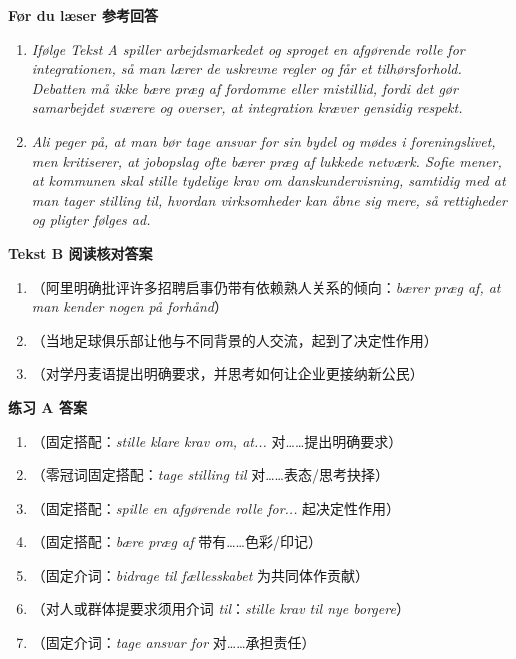 \begin{answerbox}
\textbf{Før du læser 参考回答}
\begin{enumerate}
  \item \textit{Ifølge Tekst A spiller arbejdsmarkedet og sproget en afgørende rolle for integrationen, så man lærer de uskrevne regler og får et tilhørsforhold. Debatten må ikke bære præg af fordomme eller mistillid, fordi det gør samarbejdet sværere og overser, at integration kræver gensidig respekt.}
  \item \textit{Ali peger på, at man bør tage ansvar for sin bydel og mødes i foreningslivet, men kritiserer, at jobopslag ofte bærer præg af lukkede netværk. Sofie mener, at kommunen skal stille tydelige krav om danskundervisning, samtidig med at man tager stilling til, hvordan virksomheder kan åbne sig mere, så rettigheder og pligter følges ad.}
\end{enumerate}

\textbf{Tekst B 阅读核对答案}
\begin{enumerate}
  \item {}（阿里明确批评许多招聘启事仍带有依赖熟人关系的倾向：\textit{bærer præg af, at man kender nogen på forhånd}）
  \item {}（当地足球俱乐部让他与不同背景的人交流，起到了决定性作用）
  \item {}（对学丹麦语提出明确要求，并思考如何让企业更接纳新公民）
\end{enumerate}

\textbf{练习 A 答案}
\begin{enumerate}
  \item {}（固定搭配：\textit{stille klare krav om, at...} 对……提出明确要求）
  \item {}（零冠词固定搭配：\textit{tage stilling til} 对……表态/思考抉择）
  \item {}（固定搭配：\textit{spille en afgørende rolle for...} 起决定性作用）
  \item {}（固定搭配：\textit{bære præg af} 带有……色彩/印记）
  \item {}（固定介词：\textit{bidrage til fællesskabet} 为共同体作贡献）
  \item {}（对人或群体提要求须用介词 \textit{til}：\textit{stille krav til nye borgere}）
  \item {}（固定介词：\textit{tage ansvar for} 对……承担责任）
\end{enumerate}


\end{answerbox}
